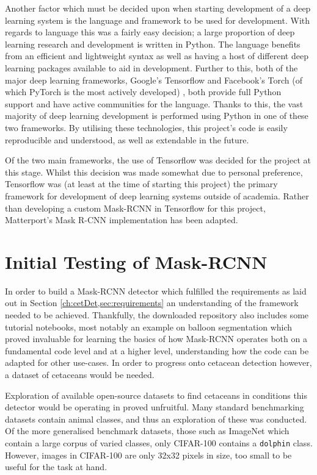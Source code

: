 Another factor which must be decided upon when starting development of a deep learning system is the language and framework to be used for development. With regards to language this was a fairly easy decision; a large proportion of deep learning research and development is written in Python. The language benefits from an efficient and lightweight syntax as well as having a host of different deep learning packages available to aid in development. Further to this, both of the major deep learning frameworks, Google's Tensorflow \cite{abadi_tensorflow:_2016} and Facebook's Torch (of which PyTorch is the most actively developed) \cite{paszke_automatic_2017}, both provide full Python support and have active communities for the language. Thanks to this, the vast majority of deep learning development is performed using Python in one of these two frameworks. By utilising these technologies, this project's code is easily reproducible and understood, as well as extendable in the future.

Of the two main frameworks, the use of Tensorflow was decided for the project at this stage. Whilst this decision was made somewhat due to personal preference, Tensorflow was (at least at the time of starting this project) the primary framework for development of deep learning systems outside of academia. Rather than developing a custom Mask-RCNN in Tensorflow for this project, Matterport's Mask R-CNN implementation \cite{waleed_mask_2017} has been adapted.

\section{Initial Testing of Mask-RCNN}\label{ch:cetDet,sec:initialTesting}

In order to build a Mask-RCNN detector which fulfilled the requirements as laid out in Section \ref{ch:cetDet,sec:requirements} an understanding of the framework needed to be achieved. Thankfully, the downloaded repository also includes some tutorial notebooks, most notably an example on balloon segmentation which proved invaluable for learning the basics of how Mask-RCNN operates both on a fundamental code level and at a higher level, understanding how the code can be adapted for other use-cases. In order to progress onto cetacean detection however, a dataset of cetaceans would be needed. 

Exploration of available open-source datasets to find cetaceans in conditions this detector would be operating in proved unfruitful. Many standard benchmarking datasets contain animal classes, and thus an exploration of these was conducted. Of the more generalised benchmark datasets, those such as ImageNet \cite{deng_imagenet:_2009} which contain a large corpus of varied classes, only CIFAR-100 \cite{krizhevsky_learning_2009} contains a \texttt{dolphin} class. However, images in CIFAR-100 are only 32x32 pixels in size, too small to be useful for the task at hand. 

